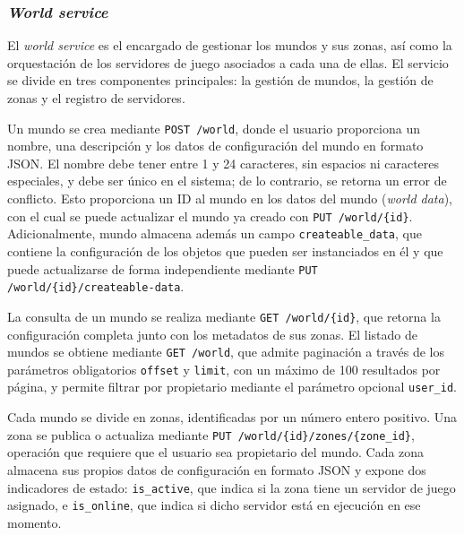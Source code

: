 \subsubsection{\textit{World service}}
\label{sec:world-service}

El \textit{world service} es el encargado de gestionar los mundos y sus zonas, así como la orquestación de los
servidores de juego asociados a cada una de ellas. El servicio se divide en tres componentes principales: la
gestión de mundos, la gestión de zonas y el registro de servidores.
\vspace{0.25cm}

Un mundo se crea mediante \texttt{POST /world}, donde el usuario proporciona un nombre, una descripción y los
datos de configuración del mundo en formato JSON. El nombre debe tener entre 1 y 24 caracteres, sin espacios ni
caracteres especiales, y debe ser único en el sistema; de lo contrario, se retorna un error de conflicto. Esto proporciona
un ID al mundo en los datos del mundo (\textit{world data}), con el cual se puede actualizar el mundo ya creado con
\texttt{PUT /world/\{id\}}. Adicionalmente, mundo almacena además un campo \texttt{createable\_data}, que contiene la 
configuración de los objetos que pueden ser instanciados en él y que puede actualizarse de forma independiente mediante
\texttt{PUT /world/\{id\}/createable-data}.
\vspace{0.25cm}

La consulta de un mundo se realiza mediante \texttt{GET /world/\{id\}}, que retorna la configuración completa
junto con los metadatos de sus zonas. El listado de mundos se obtiene mediante \texttt{GET /world}, que admite
paginación a través de los parámetros obligatorios \texttt{offset} y \texttt{limit}, con un máximo de 100
resultados por página, y permite filtrar por propietario mediante el parámetro opcional \texttt{user\_id}. 
\vspace{0.25cm}

Cada mundo se divide en zonas, identificadas por un número entero positivo. Una zona se publica o actualiza
mediante \texttt{PUT /world/\{id\}/zones/\{zone\_id\}}, operación que requiere que el usuario sea propietario
del mundo. Cada zona almacena sus propios datos de configuración en formato JSON y expone dos indicadores de
estado: \texttt{is\_active}, que indica si la zona tiene un servidor de juego asignado, e \texttt{is\_online},
que indica si dicho servidor está en ejecución en ese momento.
\vspace{0.25cm}

